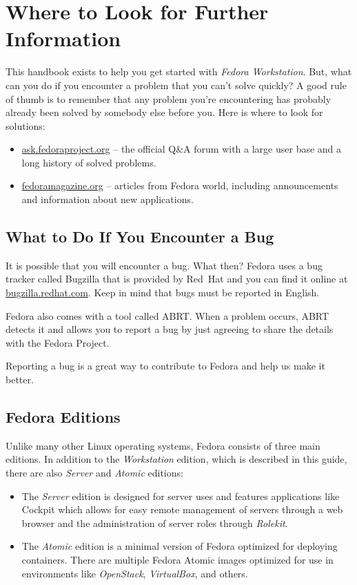 \chapter*{Where to Look for Further Information}

This handbook exists to help you get started with \emph{Fedora Workstation}. But, what can you do if you encounter a problem that you can't solve quickly? A good rule of thumb is to remember that any problem you're encountering has probably already been solved by somebody else before you. Here is where to look for solutions:
\begin{itemize}
\item\url{ask.fedoraproject.org} -- the official Q\&A forum with a large user base and a long history of solved problems.

\item\url{fedoramagazine.org} -- articles from Fedora world, including announcements and information about new applications.
\end{itemize}

\section*{What to Do If You Encounter a Bug}

It is possible that you will encounter a bug. What then? Fedora uses a bug tracker called Bugzilla that is provided by Red~Hat and you can find it online at \url{bugzilla.redhat.com}. Keep in mind that bugs must be reported in English.

Fedora also comes with a tool called ABRT. When a problem occurs, ABRT detects it and allows you to report a bug by just agreeing to share the details with the Fedora Project.

Reporting a bug is a great way to contribute to Fedora and help us make it better.

\section*{Fedora Editions}

Unlike many other Linux operating systems, Fedora consists of three main editions. In addition to the \emph{Workstation} edition, which is described in this guide, there are also \emph{Server} and \emph{Atomic} editions:
\begin{itemize}
\item The \emph{Server} edition is designed for server uses and features applications like Cockpit which allows for easy remote management of servers through a web browser and the administration of server roles through \emph{Rolekit}.

\item The \emph{Atomic} edition is a minimal version of Fedora optimized for deploying containers. There are multiple Fedora Atomic images optimized for use in environments like \emph{OpenStack}, \emph{VirtualBox}, and others.
\end{itemize}

